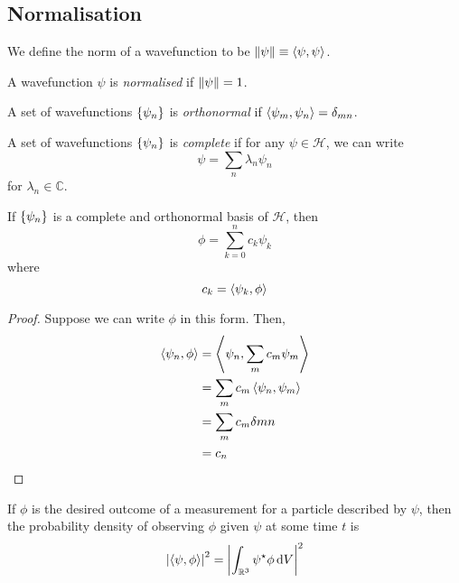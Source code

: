 \subsection{Normalisation}
\begin{definition}
	We define the norm of a wavefunction to be \( \norm{\psi} \equiv \left\langle{\psi,\psi}\right\rangle \).
\end{definition}
\begin{definition}
	A wavefunction \( \psi \) is \textit{normalised} if \( \norm{\psi} = 1 \).
\end{definition}
\begin{definition}
	A set of wavefunctions \( \qty{\psi_n} \) is \textit{orthonormal} if \( \left\langle{\psi_m, \psi_n}\right\rangle = \delta_{mn} \).
\end{definition}
\begin{definition}
	A set of wavefunctions \( \qty{\psi_n} \) is \textit{complete} if for any \( \psi \in \mathcal H \), we can write
	\[
		\psi = \sum_n \lambda_n \psi_n
	\]
	for \( \lambda_n \in \mathbb C \).
\end{definition}
\begin{proposition}
	If \( \qty{\psi_n} \) is a complete and orthonormal basis of \( \mathcal H \), then
	\[
		\phi = \sum_{k=0}^n c_k \psi_k
	\]
	where
	\[
		c_k = \left\langle{\psi_k, \phi}\right\rangle
	\]
\end{proposition}
\begin{proof}
	Suppose we can write \( \phi \) in this form.
	Then,
	\begin{align*}
		\left\langle{\psi_n, \phi}\right\rangle & = \left\langle{\psi_n, \sum_m c_m \psi_m}\right\rangle \\
		                     & = \sum_m c_m \left\langle{\psi_n, \psi_m}\right\rangle \\
		                     & = \sum_m c_m \delta{mn}             \\
		                     & = c_n
	\end{align*}
\end{proof}
\begin{remark}
	If \( \phi \) is the desired outcome of a measurement for a particle described by \( \psi \), then the probability density of observing \( \phi \) given \( \psi \) at some time \( t \) is
	\[
		\abs{\left\langle{\psi, \phi}\right\rangle}^2 = \abs{\int_{\mathbb R^3} \psi^\star \phi \dd{V}}^2
	\]
\end{remark}

